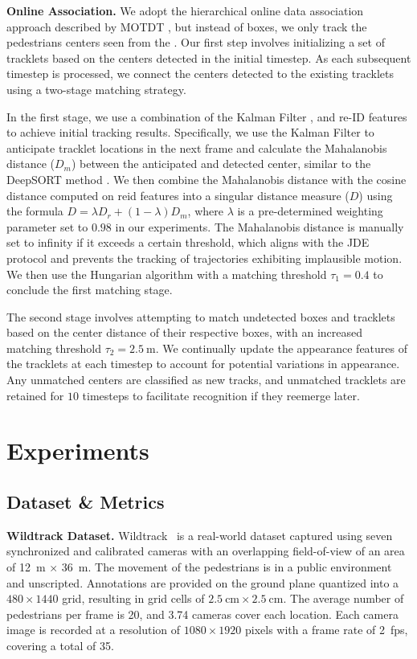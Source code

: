 \documentclass[10pt,twocolumn,letterpaper]{article}
\newcommand{\nparagraph}[1]{\noindent\textbf{#1.  }}
\begin{document}
\nparagraph{Online Association}
We adopt the hierarchical online data association approach described by MOTDT \cite{chen2018real}, but instead of boxes, we only track the pedestrians centers seen from the \textit{}. Our first step involves initializing a set of tracklets based on the centers detected in the initial timestep. As each subsequent timestep is processed, we connect the centers detected to the existing tracklets using a two-stage matching strategy.

In the first stage, we use a combination of the Kalman Filter \cite{kalman1960new}, and re-ID features to achieve initial tracking results. Specifically, we use the Kalman Filter to anticipate tracklet locations in the next frame and calculate the Mahalanobis distance ($D_m$) between the anticipated and detected center, similar to the DeepSORT method \cite{Wojke2017simple}. We then combine the Mahalanobis distance with the cosine distance computed on \gls{reid} features into a singular distance measure ($D$) using the formula $D = \lambda D_r + (1 - \lambda)D_m$, where $\lambda$ is a pre-determined weighting parameter set to $0.98$ in our experiments. The Mahalanobis distance is manually set to infinity if it exceeds a certain threshold, which aligns with the JDE protocol \cite{wang2020towards} and prevents the tracking of trajectories exhibiting implausible motion. We then use the Hungarian algorithm with a matching threshold $\tau_1 = 0.4$ to conclude the first matching stage.

The second stage involves attempting to match undetected boxes and tracklets based on the center distance of their respective boxes, with an increased matching threshold $\tau_2 = \qty{2.5}{\meter}$. We continually update the appearance features of the tracklets at each timestep to account for potential variations in appearance. Any unmatched centers are classified as new tracks, and unmatched tracklets are retained for $10$ timesteps to facilitate recognition if they reemerge later.
 \section{Experiments}\label{sec:experiments}

\subsection{Dataset \& Metrics}

\nparagraph{Wildtrack Dataset} Wildtrack~\cite{chavdarova2018wildtrack} is a real-world dataset captured using seven synchronized and calibrated cameras with an overlapping field-of-view of an area of \qty{12}{\metre} $\times$ \qty{36}{\metre}. The movement of the pedestrians is in a public environment and unscripted. Annotations are provided on the ground plane quantized into a $480 \times 1440$ grid, resulting in grid cells of $\qty{2.5}{\cm} \times \qty{2.5}{\cm}$.
The average number of pedestrians per frame is 20, and 3.74 cameras cover each location. Each camera image is recorded at a resolution of $1080 \times 1920$ pixels with a frame rate of \qty{2}{fps}, covering a total of \qty{35}{\min}.
\end{document}
